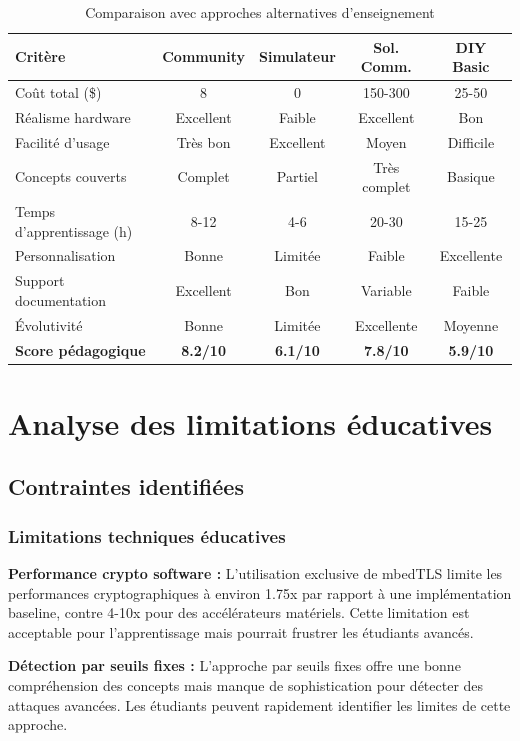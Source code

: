 \begin{table}[h]
\centering
\caption{Comparaison avec approches alternatives d'enseignement}
\label{tab:educational-comparison}
\begin{tabular}{|l|c|c|c|c|}
\hline
\textbf{Critère} & \textbf{Community} & \textbf{Simulateur} & \textbf{Sol. Comm.} & \textbf{DIY Basic} \\
\hline
Coût total (\$) & 8 & 0 & 150-300 & 25-50 \\
Réalisme hardware & Excellent & Faible & Excellent & Bon \\
Facilité d'usage & Très bon & Excellent & Moyen & Difficile \\
Concepts couverts & Complet & Partiel & Très complet & Basique \\
Temps d'apprentissage (h) & 8-12 & 4-6 & 20-30 & 15-25 \\
Personnalisation & Bonne & Limitée & Faible & Excellente \\
Support documentation & Excellent & Bon & Variable & Faible \\
Évolutivité & Bonne & Limitée & Excellente & Moyenne \\
\hline
\textbf{Score pédagogique} & \textbf{8.2/10} & \textbf{6.1/10} & \textbf{7.8/10} & \textbf{5.9/10} \\
\hline
\end{tabular}
\end{table}

\section{Analyse des limitations éducatives}

\subsection{Contraintes identifiées}

\subsubsection{Limitations techniques éducatives}

\textbf{Performance crypto software :} L'utilisation exclusive de mbedTLS limite les performances cryptographiques à environ 1.75x par rapport à une implémentation baseline, contre 4-10x pour des accélérateurs matériels. Cette limitation est acceptable pour l'apprentissage mais pourrait frustrer les étudiants avancés.

\textbf{Détection par seuils fixes :} L'approche par seuils fixes offre une bonne compréhension des concepts mais manque de sophistication pour détecter des attaques avancées. Les étudiants peuvent rapidement identifier les limites de cette approche.


